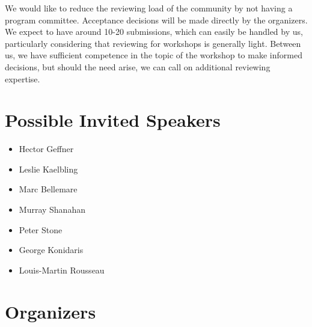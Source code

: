 \documentclass[10pt]{article}
\begin{document}
We would like to reduce the reviewing load of the community by not having a
program committee. Acceptance decisions will be made directly by the organizers.
We expect to have around 10-20 submissions, which can easily be handled by us,
particularly considering that reviewing for workshops is generally light.
Between us, we have sufficient competence in the topic of the workshop to make
informed decisions, but should the need arise, we can call on additional
reviewing expertise.

\section*{Possible Invited Speakers}

\begin{itemize}
  \item Hector Geffner
  \item Leslie Kaelbling
  \item Marc Bellemare
  \item Murray Shanahan
  \item Peter Stone
  \item George Konidaris
  \item Louis-Martin Rousseau %
\end{itemize}


\section*{Organizers}

\end{document}
